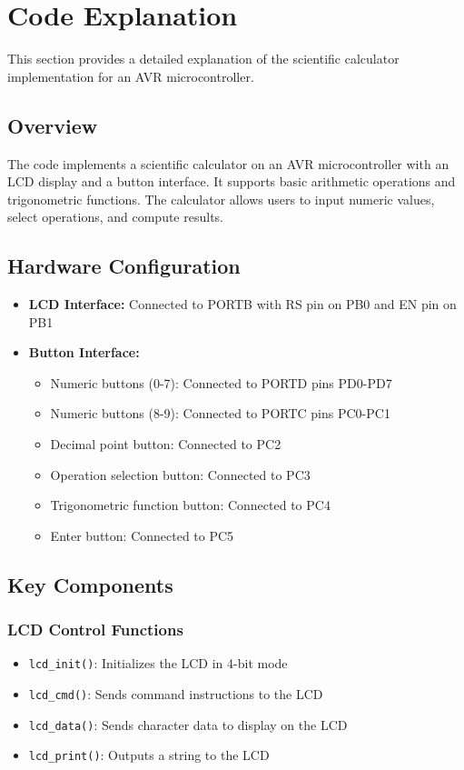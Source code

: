 \documentclass{article}
\begin{document}
\section{Code Explanation}

This section provides a detailed explanation of the scientific calculator implementation for an AVR microcontroller.

\subsection{Overview}
The code implements a scientific calculator on an AVR microcontroller with an LCD display and a button interface. It supports basic arithmetic operations and trigonometric functions. The calculator allows users to input numeric values, select operations, and compute results.

\subsection{Hardware Configuration}
\begin{itemize}
    \item \textbf{LCD Interface:} Connected to PORTB with RS pin on PB0 and EN pin on PB1
    \item \textbf{Button Interface:} 
    \begin{itemize}
        \item Numeric buttons (0-7): Connected to PORTD pins PD0-PD7
        \item Numeric buttons (8-9): Connected to PORTC pins PC0-PC1
        \item Decimal point button: Connected to PC2
        \item Operation selection button: Connected to PC3
        \item Trigonometric function button: Connected to PC4
        \item Enter button: Connected to PC5
    \end{itemize}
\end{itemize}

\subsection{Key Components}

\subsubsection{LCD Control Functions}
\begin{itemize}
    \item \texttt{lcd\_init()}: Initializes the LCD in 4-bit mode
    \item \texttt{lcd\_cmd()}: Sends command instructions to the LCD
    \item \texttt{lcd\_data()}: Sends character data to display on the LCD
    \item \texttt{lcd\_print()}: Outputs a string to the LCD
\end{itemize}
\end{document}
